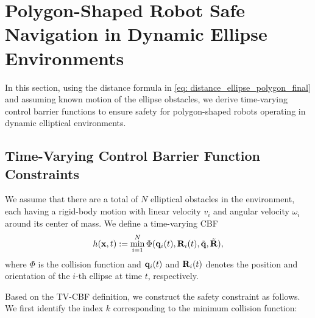 \section{Polygon-Shaped Robot Safe Navigation in Dynamic Ellipse Environments}
\label{sec: multiple_moving_ellipses_env}

In this section, using the distance formula in \eqref{eq: distance_ellipse_polygon_final} and assuming known motion of the ellipse obstacles, we derive time-varying control barrier functions to ensure safety for polygon-shaped robots operating in dynamic elliptical environments. 

\subsection{Time-Varying Control Barrier Function Constraints}

We assume that there are a total of $N$ elliptical obstacles in the environment, each having a rigid-body motion with linear velocity $v_i$ and angular velocity $\omega_i$ around its center of mass. We define a time-varying CBF 
\begin{equation}
\label{eq: tv_cbf_define}
    h(\mathbf{x}, t) := \min_{i=1}^{N} \Phi(\mathbf{q}_i(t), \mathbf{R}_i(t), \tilde{\mathbf{q}}, \tilde{\mathbf{R}}),
\end{equation}
%
where $\Phi$ is the collision function  and $\mathbf{q}_i(t)$ and $\mathbf{R}_i(t)$ denotes the position and orientation of the $i$-th ellipse at time $t$, respectively.

Based on the TV-CBF definition, we construct the safety constraint as follows. We first identify the index $k$ corresponding to the minimum collision function:

